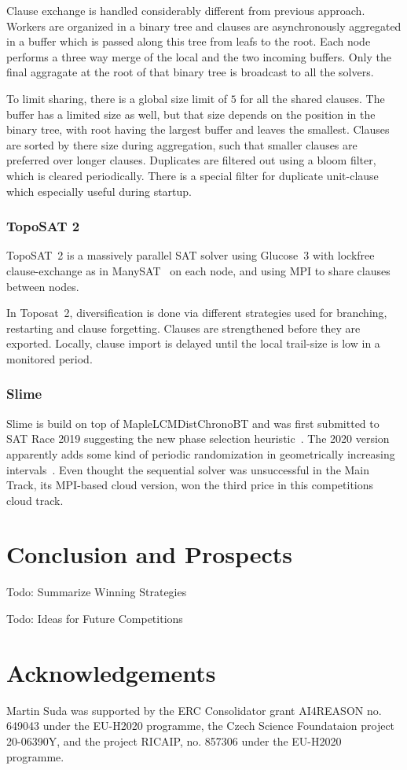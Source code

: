 \documentclass{elsarticle}
\newcommand{\todo}[1]{{\color{purple}Todo: #1}}
\begin{document}
Clause exchange is handled considerably different from previous approach. 
Workers are organized in a binary tree and clauses are asynchronously aggregated in a buffer which is passed along this tree from leafs to the root. 
Each node performs a three way merge of the local and the two incoming buffers. 
Only the final aggragate at the root of that binary tree is broadcast to all the solvers. 

To limit sharing, there is a global size limit of $5$ for all the shared clauses. 
The buffer has a limited size as well, but that size depends on the position in the binary tree, with root having the largest buffer and leaves the smallest. 
Clauses are sorted by there size during aggregation, such that smaller clauses are preferred over longer clauses. 
Duplicates are filtered out using a bloom filter, which is cleared periodically. 
There is a special filter for duplicate unit-clause which especially useful during startup. 


\subsubsection{TopoSAT 2}

TopoSAT~2 is a massively parallel SAT solver using Glucose~3 with lockfree clause-exchange as in ManySAT~\cite{} on each node, and using MPI to share clauses between nodes. 

In Toposat~2, diversification is done via different strategies used for branching, restarting and clause forgetting. 
Clauses are strengthened before they are exported. 
Locally, clause import is delayed until the local trail-size is low in a monitored period. 


\subsubsection{Slime}

Slime is build on top of MapleLCMDistChronoBT and was first submitted to SAT Race 2019 suggesting the new phase selection heuristic~\cite{}. 
The 2020 version apparently adds some kind of periodic randomization in geometrically increasing intervals~\cite{}. 
Even thought the sequential solver was unsuccessful in the Main Track, its MPI-based cloud version, won the third price in this competitions cloud track. 


\section{Conclusion and Prospects}
\label{sec:conclusion}

\todo{Summarize Winning Strategies}

\todo{Ideas for Future Competitions}

\section*{Acknowledgements}
Martin Suda was supported by the ERC Consolidator grant AI4REASON no. 649043 under the EU-H2020 programme,
the Czech Science Foundataion project 20-06390Y, and the project RICAIP, no. 857306 under the EU-H2020 programme.



\end{document}
